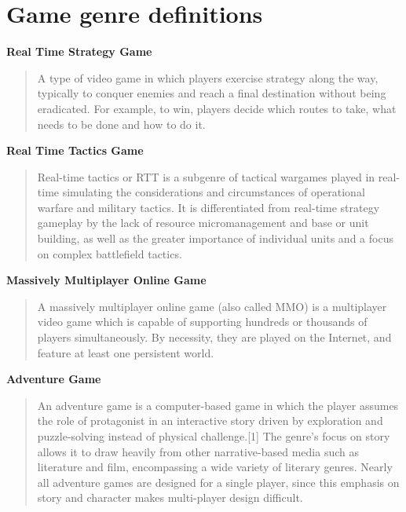 
\section{Game genre definitions}


\textbf{Real Time Strategy Game}
\begin{quote}
A type of video game in which players exercise strategy along the way, typically
to conquer enemies and reach a final destination without being eradicated. For
example, to win, players decide which routes to take, what needs to be done and
how to do it.\cite{thefreedictionary}
\end{quote}

\textbf{Real Time Tactics Game}
	
\begin{quote}
Real-time tactics or RTT is a subgenre of tactical wargames played in real-time
simulating the considerations and circumstances of operational warfare and
military tactics. It is differentiated from real-time strategy gameplay by the
lack of resource micromanagement and base or unit building, as well as the
greater importance of individual units and a focus on complex battlefield
tactics.\cite{thefreedictionary}
\end{quote}

\textbf{Massively Multiplayer Online Game}		
	
\begin{quote}
A massively multiplayer online game (also called MMO) is a multiplayer video
game which is capable of supporting hundreds or thousands of players
simultaneously. By necessity, they are played on the Internet, and feature at
least one persistent world.\cite{thefreedictionary}
\end{quote}
	
\textbf{Adventure Game}		
	
\begin{quote}
An adventure game is a computer-based game in which the player assumes the role
of protagonist in an interactive story driven by exploration and puzzle-solving
instead of physical challenge.[1] The genre's focus on story allows it to draw
heavily from other narrative-based media such as literature and film,
encompassing a wide variety of literary genres. Nearly all adventure games are
designed for a single player, since this emphasis on story and character makes
multi-player design difficult.\cite{thefreedictionary}
\end{quote}

